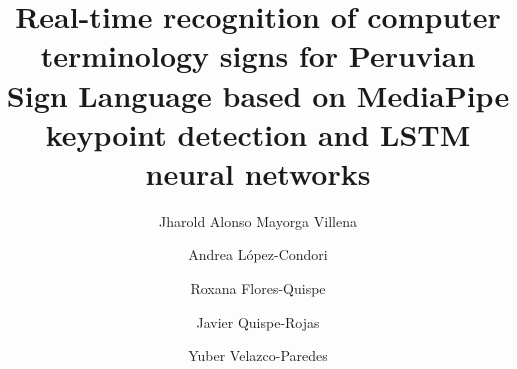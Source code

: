 \documentclass[preprint,12pt,authoryear]{elsarticle}
\begin{document}
\begin{frontmatter}



\title{Real-time recognition of computer terminology signs for Peruvian Sign Language based on MediaPipe keypoint detection and LSTM neural networks} %

\author[label1]{Jharold Alonso Mayorga Villena}

\author[label1]{Andrea López-Condori}

\author[label1]{Roxana Flores-Quispe}

\author[label1]{Javier Quispe-Rojas}

\author[label1]{Yuber Velazco-Paredes}



\end{frontmatter}
\end{document}

